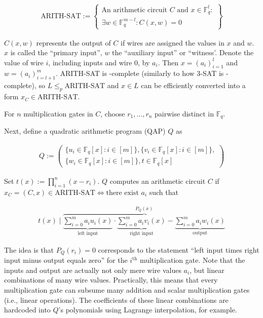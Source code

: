 \documentclass{article}
\begin{document}
\begin{align*}
        \text{ARITH-SAT} := \left\{\begin{aligned}\text{An arithmetic circuit } C \text{ and } x \in \mathbb{F}_q^l \colon \\
        \exists w \in \mathbb{F}_q^{m-l}\colon C(x,w) = 0\end{aligned}\right\}
\end{align*}

$C(x,w)$ represents the output of $C$ if wires are assigned the values in $x$ and $w$.
$x$ is called the ``primary input'', $w$ the ``auxiliary input'' or ``witness'.
Denote the value of wire $i$, including inputs and wire $0$, by $a_i$.
Then $x = (a_i)_{i=1}^l$ and $w = (a_i)_{i=l+1}^m$.
ARITH-SAT is \NP-complete (similarly to how 3-SAT is \NP-complete), so $L \leq_p \text{ARITH-SAT}$ and $x \in L$ can be efficiently converted into a form $x_C \in \text{ARITH-SAT}$.

For $n$ multiplication gates in $C$, choose $r_1, \ldots, r_n$ pairwise distinct in $\mathbb{F}_q$.

Next, define a quadratic arithmetic program (QAP) $Q$ as

\begin{align*}
        Q := \left(\begin{aligned}\{u_i \in \mathbb{F}_q[x] \colon i \in [m]\},\{v_i \in \mathbb{F}_q[x] \colon i \in [m]\},\\
        \{w_i \in \mathbb{F}_q[x] \colon i \in [m]\}, t \in \mathbb{F}_q[x]\end{aligned}\right)
\end{align*}

Set $t(x) := \prod_{i=1}^n(x-r_i)$.
$Q$ computes an arithmetic circuit $C$ if $x_C = (C,x) \in \text{ARITH-SAT} \iff \text{there exist } a_i$ such that

\begin{align*}
        t(x) \mid \overbrace{\underbrace{\sum_{i=0}^m a_iu_i(x)}_\text{left input} \cdot \underbrace{\sum_{i=0}^m a_iv_i(x)}_\text{right input} - \underbrace{\sum_{i=0}^{m} a_iw_i(x)}_\text{output}}^\text{$P_Q(x)$}
\end{align*}

The idea is that $P_Q(r_i) = 0$ corresponds to the statement ``left input times right input minus output equals zero'' for the $i^\text{th}$ multiplication gate.
Note that the inputs and output are actually not only mere wire values $a_i$, but linear combinations of many wire values.
Practically, this means that every multiplication gate can subsume many addition and scalar multiplication gates (i.e., linear operations).
The coefficients of these linear combinations are hardcoded into $Q$'s polynomials using Lagrange interpolation, for example.
\end{document}
